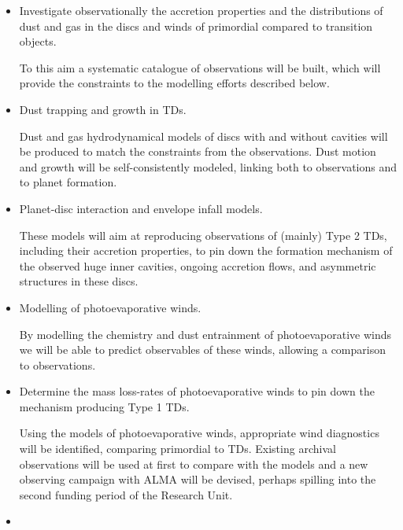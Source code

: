\documentclass[10pt,fleqn,twoside]{article}
\begin{document}
\begin{itemize}
\item
\begin{Emphasize}
  Investigate observationally the accretion properties and the distributions
  of dust and gas in the discs and winds of primordial compared to
  transition objects.
\end{Emphasize}
To this aim a systematic catalogue of observations will be built, 
which will provide the constraints to the modelling efforts described below. 
\item
\begin{Emphasize}
  Dust trapping and growth in TDs.
\end{Emphasize}
Dust and
gas hydrodynamical models of discs with and without cavities will be produced to match the
constraints from the observations. Dust motion and growth will be self-consistently
modeled, linking both to observations and to planet formation.  
\item
\begin{Emphasize}
  Planet-disc interaction and envelope infall models.
\end{Emphasize}
These models will aim at reproducing
observations of (mainly) Type 2 TDs, including their accretion properties, 
to pin down the formation mechanism of the observed huge inner cavities,
ongoing accretion flows, and asymmetric structures in these discs.
\item
\begin{Emphasize}
  Modelling of photoevaporative winds.
\end{Emphasize}
By modelling the chemistry and dust entrainment of photoevaporative winds
we will be able to predict observables of these winds, allowing a comparison
to observations.
\item
\begin{Emphasize}
  Determine the mass loss-rates of photoevaporative winds to pin down the
  mechanism producing Type 1 TDs.
\end{Emphasize}
Using the models of photoevaporative winds, appropriate wind diagnostics 
will be identified, comparing primordial to
TDs. Existing archival observations will be used at first to compare
with the models and a new observing campaign with ALMA will be
devised, perhaps spilling into the second funding period of the Research Unit.
\item
\begin{Emphasize}

\end{Emphasize}
\end{itemize}
\end{document}
